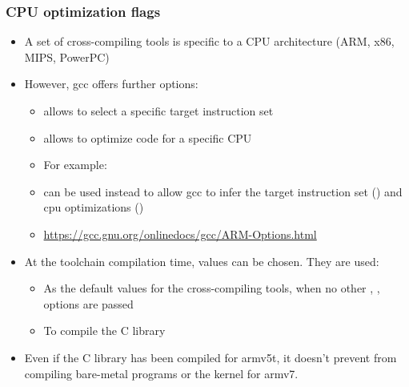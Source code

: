 \begin{frame}
  \frametitle{CPU optimization flags}
  \begin{itemize}
  \item A set of cross-compiling tools is specific to a CPU architecture (ARM,
    x86, MIPS, PowerPC)
  \item However, gcc offers further options:
    \begin{itemize}
    \item {} allows to select a specific target instruction set
    \item {} allows to optimize code for a specific CPU
    \item For example: 
    \item {} can be used instead to allow gcc to infer the target
      instruction set () and cpu optimizations ()
    \item \url{https://gcc.gnu.org/onlinedocs/gcc/ARM-Options.html}
    \end{itemize}
  \item At the toolchain compilation time, values can be chosen. They are used:
    \begin{itemize}
    \item As the default values for the cross-compiling tools, when no
      other , ,  options are
      passed
    \item To compile the C library
    \end{itemize}
  \item Even if the C library has been compiled for armv5t, it doesn't
    prevent from compiling bare-metal programs or the kernel for armv7.
  \end{itemize}
\end{frame}

